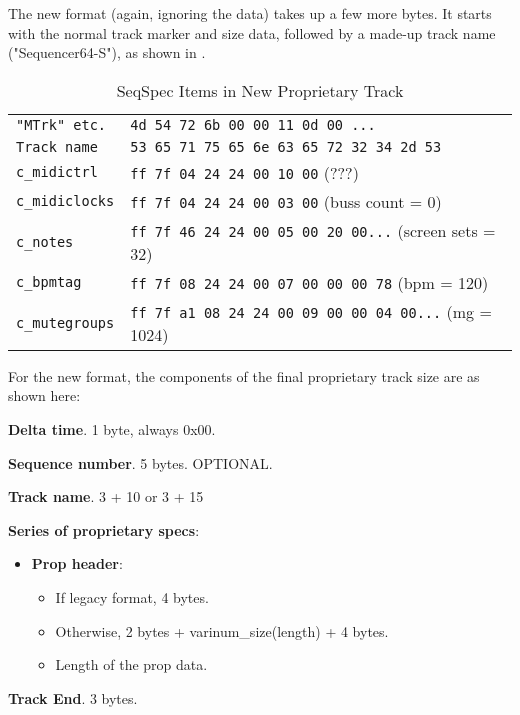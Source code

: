    The new format (again, ignoring the data) takes up a few more bytes.
   It starts with the normal track marker and size data, followed by a
   made-up track name ("Sequencer64-S"),
   as shown in .

   \begin{table}[htb]
      \centering
      \caption{SeqSpec Items in New Proprietary Track}
      \label{table:seqspec_items_new_track}
      \begin{tabular}{l l}
\texttt{"MTrk" etc.}   & \texttt{4d 54 72 6b 00 00 11 0d 00 ...} \\
\texttt{Track name}    & \texttt{53 65 71 75 65 6e 63 65 72 32 34 2d 53} \\
\texttt{c\_midictrl}   & \texttt{ff 7f 04 24 24 00 10 00} (???) \\
\texttt{c\_midiclocks} & \texttt{ff 7f 04 24 24 00 03 00} (buss count = 0) \\
\texttt{c\_notes}      & \texttt{ff 7f 46 24 24 00 05 00 20 00...} (screen sets = 32) \\
\texttt{c\_bpmtag}     & \texttt{ff 7f 08 24 24 00 07 00 00 00 78} (bpm = 120) \\
\texttt{c\_mutegroups} & \texttt{ff 7f a1 08 24 24 00 09 00 00 04 00...} (mg = 1024) \\
      \end{tabular}
   \end{table}

For the new format, the components of the final proprietary track size are
as shown here:

   \begin{enumber}
      \item \textbf{Delta time}.  1 byte, always 0x00.
      \item \textbf{Sequence number}.  5 bytes.  OPTIONAL.
      \item \textbf{Track name}. 3 + 10 or 3 + 15
      \item \textbf{Series of proprietary specs}:
      \begin{itemize}
         \item \textbf{Prop header}:
         \begin{itemize}
            \item If legacy format, 4 bytes.
            \item Otherwise, 2 bytes + varinum\_size(length) + 4 bytes.
            \item Length of the prop data.
         \end{itemize}
      \end{itemize}
      \item \textbf{Track End}. 3 bytes.
   \end{enumber}

